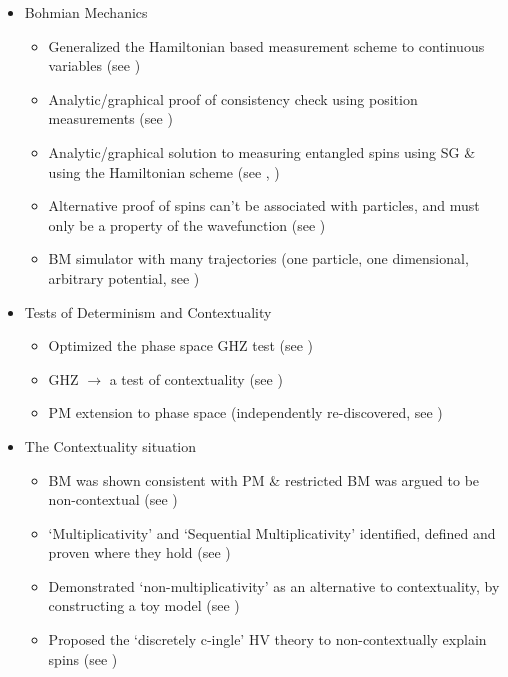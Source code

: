 \begin{itemize}
\item Bohmian Mechanics

\begin{itemize}
\item Generalized the Hamiltonian based measurement scheme to continuous
variables (see )
\item Analytic/graphical proof of consistency check using position measurements
(see )
\item Analytic/graphical solution to measuring entangled spins using SG
\& using the Hamiltonian scheme (see ,
)
\item Alternative proof of spins can't be associated with particles, and
must only be a property of the wavefunction (see )
\item BM simulator with many trajectories (one particle, one dimensional,
arbitrary potential, see )
\end{itemize}
\item Tests of Determinism and Contextuality

\begin{itemize}
\item Optimized the phase space GHZ test (see )
\item GHZ $\to$ a test of contextuality (see )
\item PM extension to phase space (independently re-discovered, see )
\end{itemize}
\item The Contextuality situation

\begin{itemize}
\item BM was shown consistent with PM \& restricted BM was argued to be
non-contextual (see )
\item `Multiplicativity' and `Sequential Multiplicativity' identified, defined
and proven where they hold (see )
\item Demonstrated `non-multiplicativity' as an alternative to contextuality,
by constructing a toy model (see )
\item Proposed the `discretely c-ingle' HV theory to non-contextually explain
spins (see )
\end{itemize}
\end{itemize}

